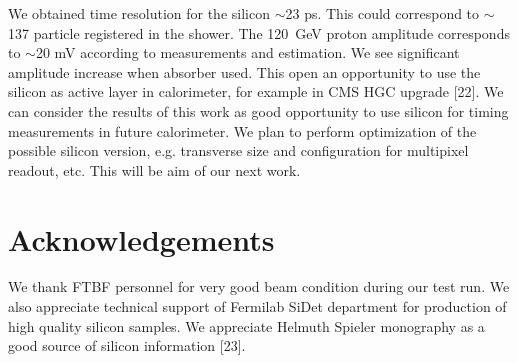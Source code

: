 \documentclass[12pt]{article}
\begin{document}
We obtained time resolution for the silicon $\sim$23 ps. This could correspond to
$\sim$137 particle registered in the shower. The 120~GeV proton amplitude corresponds
to $\sim$20 mV according to measurements and estimation. We see significant amplitude
increase when absorber used. This open an opportunity to use the silicon as
active layer in calorimeter, for example in CMS HGC upgrade [22]. We can
consider the results of this work as good opportunity to use silicon for timing
measurements in future calorimeter. We plan to perform optimization of the
possible silicon version, e.g. transverse size and configuration for multipixel
readout, etc. This will be aim of our next work.


\section{Acknowledgements} We thank FTBF personnel for very good beam condition during our test run. We also appreciate technical support of Fermilab SiDet department for production of high quality silicon samples. We appreciate Helmuth Spieler monography as a good source of silicon information [23].

{}
 
\end{document}
